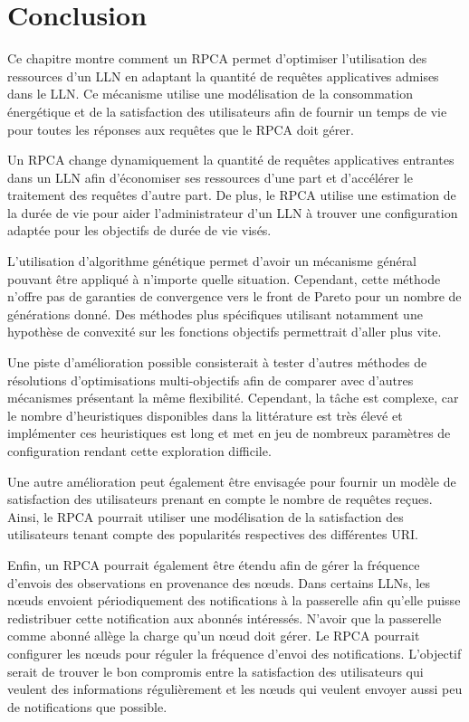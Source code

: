 \section{Conclusion}
\label{cache:conclusion}


Ce chapitre montre comment un \ac{RPCA} permet d'optimiser l'utilisation des ressources d'un \ac{LLN} en adaptant la quantité de requêtes applicatives admises dans le \ac{LLN}.
Ce mécanisme utilise une modélisation de la consommation énergétique et de la satisfaction des utilisateurs afin de fournir un temps de vie pour toutes les réponses
aux requêtes que le \ac{RPCA} doit gérer.


Un \ac{RPCA} change dynamiquement la quantité de requêtes applicatives entrantes dans un \ac{LLN} afin d'économiser ses ressources d'une part et d'accélérer le traitement des requêtes d'autre part.
De plus, le \ac{RPCA} utilise une estimation de la durée de vie pour aider l'administrateur d'un \ac{LLN} à trouver une configuration adaptée pour les objectifs de durée de vie visés.


L'utilisation d'algorithme génétique permet d'avoir un mécanisme général pouvant être appliqué à n'importe quelle situation.
Cependant, cette méthode n'offre pas de garanties de convergence vers le front de Pareto pour un nombre de générations donné.
Des méthodes plus spécifiques utilisant notamment une hypothèse de convexité sur les fonctions objectifs permettrait d'aller plus vite.


Une piste d'amélioration possible consisterait à tester d'autres méthodes de résolutions d'optimisations multi-objectifs afin de comparer avec d'autres mécanismes présentant la même flexibilité.
Cependant, la tâche est complexe, car le nombre d'heuristiques disponibles dans la littérature est très élevé et implémenter ces heuristiques est long et met en jeu de nombreux paramètres de configuration rendant cette exploration difficile.

Une autre amélioration peut également être envisagée pour fournir un modèle de satisfaction des utilisateurs prenant en compte le nombre de requêtes reçues.
Ainsi, le \ac{RPCA} pourrait utiliser une modélisation de la satisfaction des utilisateurs tenant compte des popularités respectives des différentes \ac{URI}.

Enfin, un \ac{RPCA} pourrait également être étendu afin de gérer la fréquence d'envois des observations en provenance des nœuds.
Dans certains \ac{LLN}s, les nœuds envoient périodiquement des notifications à la passerelle afin qu'elle puisse redistribuer cette notification aux abonnés intéressés.
N'avoir que la passerelle comme abonné allège la charge qu'un nœud doit gérer.
Le \ac{RPCA} pourrait configurer les nœuds pour réguler la fréquence d'envoi des notifications.
L'objectif serait de trouver le bon compromis entre la satisfaction des utilisateurs qui veulent des informations régulièrement et les nœuds qui veulent envoyer aussi peu de notifications que possible.

